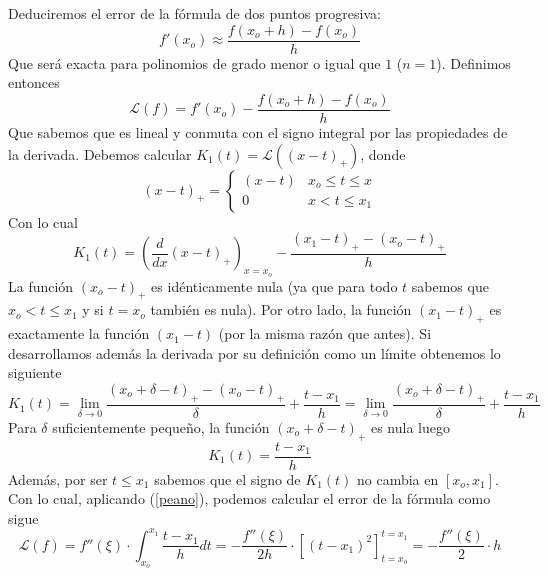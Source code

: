         \begin{ejem}
        Deduciremos el error de la fórmula de dos puntos progresiva:
        $$f'(x_o)\approx\dfrac{f(x_o+h)-f(x_o)}{h}$$
        Que será exacta para polinomios de grado menor o igual que $1$ ($n=1$). Definimos entonces
        $$\mathcal{L}(f)=f'(x_o)-\dfrac{f(x_o+h)-f(x_o)}{h}$$
        Que sabemos que es lineal y conmuta con el signo integral por las propiedades de la derivada. Debemos calcular $K_1(t)=\mathcal{L}((x-t)_+)$, donde
        $$(x-t)_+=\left\{\begin{array}{cc}
             (x-t) & x_o\leq t\leq x  \\
             0 & x<t\leq x_1
        \end{array}\right.$$
        Con lo cual
        $$K_1(t)=\left(\dfrac{d}{dx} (x-t)_+\right)_{x=x_o}-\dfrac{(x_1-t)_+-(x_o-t)_+}{h}$$
        La función $(x_o-t)_+$ es idénticamente nula (ya que para todo $t$ sabemos que $x_o<t\leq x_1$ y si $t=x_o$ también es nula). Por otro lado, la función $(x_1-t)_+$ es exactamente la función $(x_1-t)$ (por la misma razón que antes). Si desarrollamos además la derivada por su definición como un límite obtenemos lo siguiente
        $$K_1(t)=\lim_{\delta\to 0}\dfrac{(x_o+\delta-t)_+-(x_o-t)_+}{\delta}+\dfrac{t-x_1}{h}=\lim_{\delta\to 0}\dfrac{(x_o+\delta-t)_+}{\delta}+\dfrac{t-x_1}{h}$$
        Para $\delta$ suficientemente pequeño, la función $(x_o+\delta-t)_+$ es nula luego
        $$K_1(t)=\dfrac{t-x_1}{h}$$
        Además, por ser $t\leq x_1$ sabemos que el signo de $K_1(t)$ no cambia en $[x_o,x_1]$. Con lo cual, aplicando (\ref{peano}), podemos calcular el error de la fórmula como sigue
        $$\mathcal{L}(f)=f''(\xi)\cdot \int_{x_o}^{x_1}\dfrac{t-x_1}{h}dt=-\dfrac{f''(\xi)}{2h}\cdot [(t-x_1)^2]_{t=x_o}^{t=x_1}=-\dfrac{f''(\xi)}{2}\cdot h$$
                \end{ejem}        


